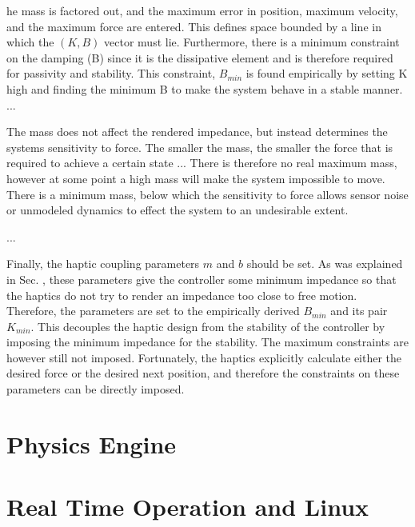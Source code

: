 \documentclass[12pt]{report}
\begin{document}
	he mass is factored out, and the maximum error in position, maximum velocity, and the maximum force are entered. This defines space bounded by a line in which the $(K,B)$ vector must lie. Furthermore, there is a minimum constraint on the damping (B) since it is the dissipative element and is therefore required for passivity and stability. This constraint, $B_{min}$ is found empirically by setting K high and finding the minimum B to make the system behave in a stable manner. ...

	The mass does not affect the rendered impedance, but instead determines the systems sensitivity to force. The smaller the mass, the smaller the force that is required to achieve a certain state ... There is therefore no real maximum mass, however at some point a high mass will make the system impossible to move. There is a minimum mass, below which the sensitivity to force allows sensor noise or unmodeled dynamics to effect the system to an undesirable extent. 
	
	...
	
	Finally, the haptic coupling parameters $m$ and $b$ should be set. As was explained in Sec. , these parameters give the controller some minimum impedance so that the haptics do not try to render an impedance too close to free motion. Therefore, the parameters are set to the empirically derived $B_{min}$ and its pair $K_{min}$. This decouples the haptic design from the stability of the controller by imposing the minimum impedance for the stability. The maximum constraints are however still not imposed. Fortunately, the haptics explicitly calculate either the desired force or the desired next position, and therefore the constraints on these parameters can be directly imposed. 
		
	\section{Physics Engine}
	
			
		
	\section{Real Time Operation and Linux}
	
%
\end{document}
